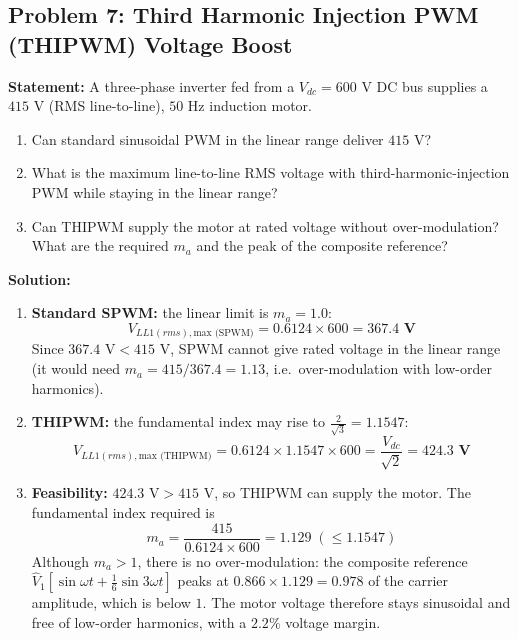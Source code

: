 \documentclass[11pt,a4paper]{article}
\let\origsubsection\subsection
\renewcommand{\subsection}{\Needspace{7\baselineskip}\origsubsection}
\begin{document}
\subsection{Problem 7: Third Harmonic Injection PWM (THIPWM) Voltage Boost}
\begin{examplebox}
\textbf{Statement:} A three-phase inverter fed from a $V_{dc} = 600\text{ V}$ DC bus supplies a $415\text{ V}$ (RMS line-to-line), $50\text{ Hz}$ induction motor.
\begin{enumerate}
  \item Can standard sinusoidal PWM in the linear range deliver $415\text{ V}$?
  \item What is the maximum line-to-line RMS voltage with third-harmonic-injection PWM while staying in the linear range?
  \item Can THIPWM supply the motor at rated voltage without over-modulation? What are the required $m_a$ and the peak of the composite reference?
\end{enumerate}

\tcblower
\textbf{Solution:}
\begin{enumerate}
  \item \textbf{Standard SPWM:} the linear limit is $m_a = 1.0$:
  \begin{equation*}
  V_{LL1(rms),\text{max (SPWM)}} = 0.6124 \times 600 = \mathbf{367.4\text{ V}}
  \end{equation*}
  Since $367.4\text{ V} < 415\text{ V}$, SPWM cannot give rated voltage in the linear range (it would need $m_a = 415/367.4 = 1.13$, i.e.\ over-modulation with low-order harmonics).

  \item \textbf{THIPWM:} the fundamental index may rise to $\frac{2}{\sqrt{3}} = 1.1547$:
  \begin{equation*}
  V_{LL1(rms),\text{max (THIPWM)}} = 0.6124 \times 1.1547 \times 600 = \frac{V_{dc}}{\sqrt{2}} = \mathbf{424.3\text{ V}}
  \end{equation*}

  \item \textbf{Feasibility:} $424.3\text{ V} > 415\text{ V}$, so THIPWM can supply the motor. The fundamental index required is
  \begin{equation*}
  m_a = \frac{415}{0.6124 \times 600} = \mathbf{1.129} \;(\le 1.1547)
  \end{equation*}
  Although $m_a > 1$, there is no over-modulation: the composite reference $\hat{V}_1\left[\sin\omega t + \frac{1}{6}\sin 3\omega t\right]$ peaks at $0.866 \times 1.129 = \mathbf{0.978}$ of the carrier amplitude, which is below $1$. The motor voltage therefore stays sinusoidal and free of low-order harmonics, with a $2.2\%$ voltage margin.
\end{enumerate}
\end{examplebox}
\end{document}
